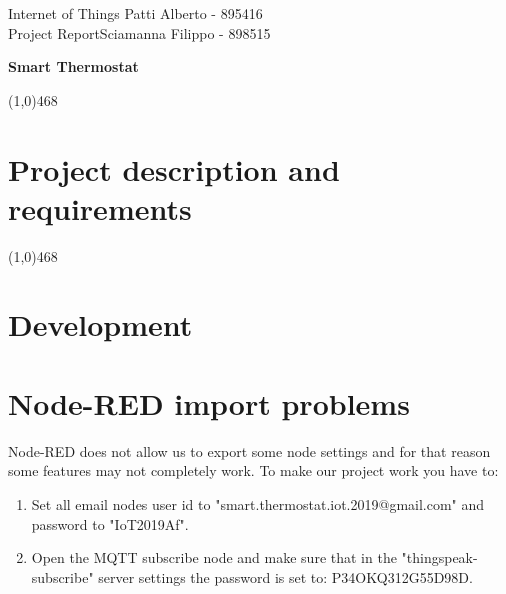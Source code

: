 \documentclass[letterpaper, 11pt]{article}
\newcommand{\hl}{\begin{center} \line(1,0){468} \end{center}} %
\newcommand{\ctitle}[1]{\begin{center} \huge{\textbf{#1}} \end{center}} %
\begin{document}
\noindent
Internet of Things \hfill  Patti Alberto - 895416\\
Project Report\hfill Sciamanna Filippo - 898515


\ctitle{Smart Thermostat}


\hl
\section*{Project description and requirements}
 

\hl 

\section*{Development}
 

\section*{Node-RED import problems}
Node-RED does not allow us to export some node settings and for that reason some features may not completely work. 
To make our project work you have to: 
\begin{enumerate}
	\setcounter{enumi}{0}
	\item Set all email nodes user id to "smart.thermostat.iot.2019@gmail.com" and password to "IoT2019Af".
	\item Open the MQTT subscribe node and make sure that in the "thingspeak-subscribe" server settings the password is set to: P34OKQ312G55D98D.
\end{enumerate}
\end{document}

